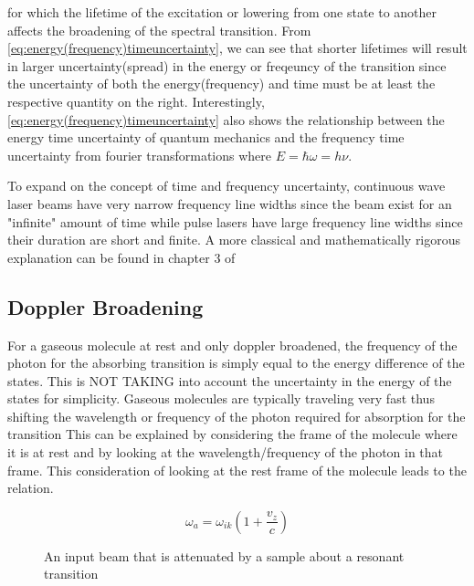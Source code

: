 \documentclass[11pt,a4paper]{book}
\newcommand{\imginput}[1]{} %
\begin{document}
			\noindent
			for which the lifetime of the excitation or lowering from one state to another affects the broadening of the spectral transition. From \autoref{eq:energy(frequency)timeuncertainty}, we can see that shorter lifetimes will result in larger uncertainty(spread) in the energy or freqeuncy of the transition since the uncertainty of both the energy(frequency) and time must be at least the respective quantity on the right. Interestingly, \autoref{eq:energy(frequency)timeuncertainty} also shows the relationship between the energy time uncertainty of quantum mechanics and the frequency time uncertainty from fourier transformations where $E=\hbar \omega =h \nu$. 
			
			To expand on the concept of time and frequency uncertainty, continuous wave laser beams have very narrow frequency line widths since the beam exist for an "infinite" amount of time while pulse lasers have large frequency line widths since their duration are short and finite. A more classical and mathematically rigorous explanation can be found in chapter 3 of \cite{LaserSpec1}
			
		\subsection{Doppler Broadening}
			\label{subsec:Doppler Broadening}
			For a gaseous molecule at rest and only doppler broadened, the frequency of the photon for the absorbing transition is simply equal to the energy difference of the states. 
			This is NOT TAKING into account the uncertainty in the energy of the states for simplicity.
			Gaseous molecules are typically traveling very fast thus shifting the wavelength or frequency of the photon required for absorption for the transition
			This can be explained by considering the frame of the molecule where it is at rest and by looking at the wavelength/frequency of the photon in that frame. 
			This consideration of looking at the rest frame of the molecule leads to the relation.
			
			\begin{equation}
				\label{eq:frequencyInNewRestFrame}
				\omega_a =\omega_{ik} \left(1+\dfrac{v_z}{c} \right)
			\end{equation}
			
			\begin{figure} [!ht]
				\centering
				\def\svgwidth{\columnwidth}
				\resizebox{150mm}{!}{\imginput{images/dop-broad.pdf_tex}}
				\label{fig:dop-broad}
				\caption{An input beam that is attenuated by a sample about a resonant transition}
			\end{figure}	
			
\end{document}
